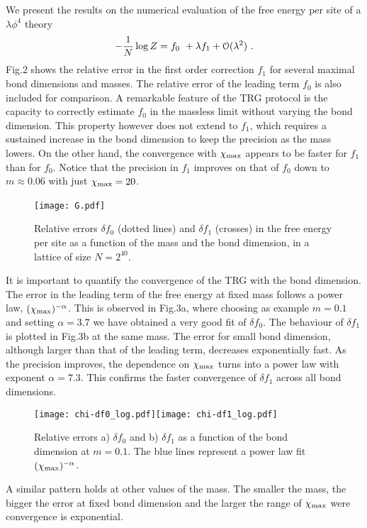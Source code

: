 \documentclass[a4paper,preprintnumbers,nofootinbib,twocolumn]{quantumarticle}
\newcommand{\be}{\begin{equation}} \newcommand{\ee}{\end{equation}}
\begin{document}
We present the results on the numerical evaluation of the free energy per site of a $\lambda \phi^4$ theory 
\be 
- {1 \over N} \log Z = f_0\ + \lambda f_1 + {\cal O}(\lambda^2) \ .
\ee
Fig.2 shows the relative error in the first order correction $f_1$
for several maximal bond dimensions and masses. The relative error of the leading term $f_0$ is also included for comparison.
A remarkable feature of the TRG protocol is the capacity to correctly estimate $f_0$ in the massless limit without varying the bond dimension.
This property however does not extend to $f_1$, which requires a sustained increase in the bond dimension to keep the precision as
the mass lowers. On the other hand, the convergence with $\chi_{\rm max}$ appears to be faster for $f_1$ than for $f_0$.
Notice that the precision in $f_1$  improves on that of $f_0$ down to  $m\approx0.06$ with just $\chi_{\rm max}=20$.

\begin{figure}[h]
\begin{center}
\texttt{[image: G.pdf]}~~~
\end{center}
\vspace*{-5mm}
\caption{\label{fig:fe0} Relative errors $\delta f_0$ (dotted lines) and $\delta f_1$ (crosses) in the free energy per site as a function of the mass and the bond dimension, in a
 lattice of size $N=2^{40}$.} 
\end{figure}

It is important to quantify the convergence of the TRG with the bond dimension. The error in the leading term of the free energy at fixed mass follows a 
power law, $( \chi_{\rm max})^{-\alpha}$. This is observed in Fig.3a, where
choosing as example $m=0.1$ and setting $\alpha=3.7$ we have obtained a very good fit of $\delta f_0$. 
The behaviour of $\delta f_1$ 
is plotted in Fig.3b at the same mass. 
The error for small bond dimension, although larger than that of the leading term, decreases exponentially fast.
As the precision improves, the dependence on $\chi_{\rm max}$ turns into a power law with exponent $\alpha=7.3$.
This confirms the faster
convergence of $\delta f_1$ across all bond dimensions. 
\begin{figure}[h]
\begin{center}
\texttt{[image: chi-df0\_log.pdf]}\texttt{[image: chi-df1\_log.pdf]}
\end{center}
\vspace*{-5mm}
\caption{\label{fig:fe1} Relative errors a) $\delta f_0$ and b) $\delta f_1$ as a function of the bond dimension at $m=0.1$. The blue lines represent a power law fit $(\chi_{\rm max})^{-\alpha}$. }
\end{figure}
A similar pattern holds at other values of the mass. The smaller the mass, the bigger the error at fixed bond dimension and the larger the range of $\chi_{\rm max}$ were
convergence is exponential. 
\end{document}
